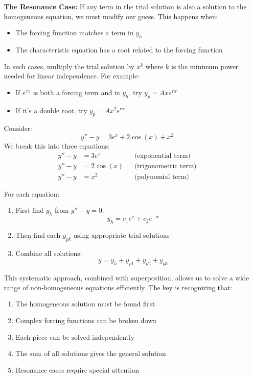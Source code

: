 \noindent \textbf{The Resonance Case:} If any term in the trial solution is also a solution to the homogeneous equation, we must modify our guess. This happens when:
\begin{itemize}
    \item The forcing function matches a term in $y_h$
    \item The characteristic equation has a root related to the forcing function
\end{itemize}

\noindent In such cases, multiply the trial solution by $x^k$ where $k$ is the minimum power needed for linear independence. For example:
\begin{itemize}
    \item If $e^{rx}$ is both a forcing term and in $y_h$, try $y_p = Axe^{rx}$
    \item If it's a double root, try $y_p = Ax^2e^{rx}$
\end{itemize}

\noindent Consider:
\[
y'' - y = 3e^x + 2\cos(x) + x^2
\]
We break this into three equations:
\begin{align*}
y'' - y &= 3e^x && \text{(exponential term)} \\
y'' - y &= 2\cos(x) && \text{(trigonometric term)} \\
y'' - y &= x^2 && \text{(polynomial term)}
\end{align*}

\noindent For each equation:
\begin{enumerate}
    \item First find $y_h$ from $y'' - y = 0$: 
       \[
       y_h = c_1e^x + c_2e^{-x}
       \]
       
    \item Then find each $y_{pk}$ using appropriate trial solutions
    
    \item Combine all solutions: 
       \[
       y = y_h + y_{p1} + y_{p2} + y_{p3}
       \]
\end{enumerate}

\noindent This systematic approach, combined with superposition, allows us to solve a wide range of non-homogeneous equations efficiently. The key is recognizing that:
\begin{enumerate}
    \item The homogeneous solution must be found first
    \item Complex forcing functions can be broken down
    \item Each piece can be solved independently
    \item The sum of all solutions gives the general solution
    \item Resonance cases require special attention
\end{enumerate}

